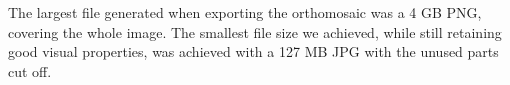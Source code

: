 \documentclass[../Head/Main.tex]{subfiles}
\begin{document}
The largest file generated when exporting the orthomosaic was a 4 GB PNG, covering the whole image. 
The smallest file size we achieved, while still retaining good visual properties, was achieved with a 127 MB JPG with the unused parts cut off.
\end{document}
